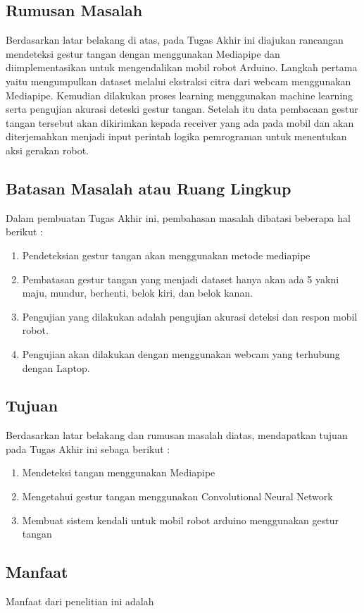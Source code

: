 \subsection{Rumusan Masalah}

Berdasarkan latar belakang di atas, pada Tugas Akhir ini diajukan rancangan mendeteksi gestur tangan dengan menggunakan Mediapipe dan diimplementasikan untuk mengendalikan mobil robot Arduino. Langkah pertama yaitu mengumpulkan dataset melalui ekstraksi citra dari webcam menggunakan Mediapipe. Kemudian dilakukan proses learning menggunakan machine learning serta pengujian akurasi deteski gestur tangan. Setelah itu data pembacaan gestur tangan tersebut akan dikirimkan kepada receiver yang ada pada mobil dan akan diterjemahkan menjadi input perintah logika pemrograman untuk menentukan aksi gerakan robot.

\subsection{Batasan Masalah atau Ruang Lingkup}

Dalam pembuatan Tugas Akhir ini, pembahasan masalah dibatasi beberapa hal berikut :
\begin{enumerate}
	\item Pendeteksian gestur tangan akan menggunakan metode mediapipe
	\item Pembatasan gestur tangan yang menjadi dataset hanya akan ada 5 yakni maju, mundur, berhenti, belok kiri, dan belok kanan.
	\item Pengujian yang dilakukan adalah pengujian akurasi deteksi dan respon mobil robot.
	\item Pengujian akan dilakukan dengan menggunakan webcam yang terhubung dengan Laptop.
\end{enumerate}

\subsection{Tujuan}

Berdasarkan latar belakang dan rumusan masalah diatas, mendapatkan tujuan pada Tugas Akhir ini sebaga berikut :
\begin{enumerate}
	\item Mendeteksi tangan menggunakan Mediapipe
	\item Mengetahui gestur tangan menggunakan Convolutional Neural Network
	\item Membuat sistem kendali untuk mobil robot arduino menggunakan gestur tangan
\end{enumerate}

\subsection{Manfaat}

Manfaat dari penelitian ini adalah \lipsum[8][1-14]
